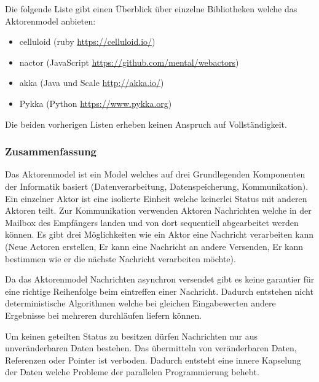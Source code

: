 Die folgende Liste gibt einen Überblick über einzelne Bibliotheken welche das Aktorenmodel anbieten:

\begin{itemize}
  \item celluloid (ruby \url{https://celluloid.io/})
  \item nactor (JavaScript \url{https://github.com/mental/webactors})
  \item akka (Java und Scale \url{http://akka.io/})
  \item Pykka (Python \url{https://www.pykka.org})
\end{itemize}

Die beiden vorherigen Listen erheben keinen Anspruch auf Vollständigkeit. 


\subsubsection{Zusammenfassung}
Das Aktorenmodel ist ein Model welches auf drei Grundlegenden Komponenten der Informatik basiert (Datenverarbeitung, Datenspeicherung, Kommunikation). Ein einzelner Aktor ist eine isolierte Einheit welche keinerlei Status mit anderen Aktoren teilt. Zur Kommunikation verwenden Aktoren Nachrichten welche in der Mailbox des Empfängers landen und von dort sequentiell abgearbeitet werden können. Es gibt drei Möglichkeiten wie ein Aktor eine Nachricht verarbeiten kann (Neue Actoren erstellen, Er kann eine Nachricht an andere Versenden, Er kann bestimmen wie er die nächste Nachricht verarbeiten möchte).

Da das Aktorenmodel Nachrichten asynchron versendet gibt es keine garantier für eine richtige Reihenfolge beim eintreffen einer Nachricht. Dadurch entstehen nicht deterministische Algorithmen welche bei gleichen Eingabewerten andere Ergebnisse bei mehreren durchläufen liefern können. 

Um keinen geteilten Status zu besitzen dürfen Nachrichten nur aus unveränderbaren Daten bestehen. Das übermitteln von veränderbaren Daten, Referenzen oder Pointer ist verboden. Dadurch entsteht eine innere Kapselung der Daten welche Probleme der parallelen Programmierung behebt.